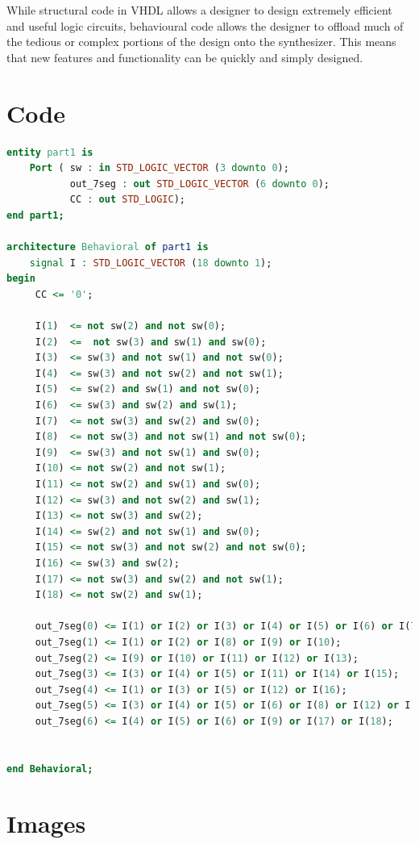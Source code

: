 \documentclass{article}
\begin{document}
While structural code in VHDL allows a designer to design extremely efficient and useful
logic circuits, behavioural code allows the designer to offload much of the tedious or complex
portions of the design onto the synthesizer.
This means that new features and functionality can be quickly and simply designed.

\newpage


\appendix

\section{Code}

\begin{lstlisting}[language=VHDL]
entity part1 is
    Port ( sw : in STD_LOGIC_VECTOR (3 downto 0);
           out_7seg : out STD_LOGIC_VECTOR (6 downto 0);
           CC : out STD_LOGIC);
end part1;

architecture Behavioral of part1 is
    signal I : STD_LOGIC_VECTOR (18 downto 1);
begin
     CC <= '0';

     I(1)  <= not sw(2) and not sw(0);
     I(2)  <=  not sw(3) and sw(1) and sw(0);
     I(3)  <= sw(3) and not sw(1) and not sw(0);
     I(4)  <= sw(3) and not sw(2) and not sw(1);
     I(5)  <= sw(2) and sw(1) and not sw(0);
     I(6)  <= sw(3) and sw(2) and sw(1);
     I(7)  <= not sw(3) and sw(2) and sw(0);
     I(8)  <= not sw(3) and not sw(1) and not sw(0);
     I(9)  <= sw(3) and not sw(1) and sw(0);
     I(10) <= not sw(2) and not sw(1);
     I(11) <= not sw(2) and sw(1) and sw(0);
     I(12) <= sw(3) and not sw(2) and sw(1);
     I(13) <= not sw(3) and sw(2);
     I(14) <= sw(2) and not sw(1) and sw(0);
     I(15) <= not sw(3) and not sw(2) and not sw(0);
     I(16) <= sw(3) and sw(2);
     I(17) <= not sw(3) and sw(2) and not sw(1);
     I(18) <= not sw(2) and sw(1);
     
     out_7seg(0) <= I(1) or I(2) or I(3) or I(4) or I(5) or I(6) or I(7);
     out_7seg(1) <= I(1) or I(2) or I(8) or I(9) or I(10);
     out_7seg(2) <= I(9) or I(10) or I(11) or I(12) or I(13);
     out_7seg(3) <= I(3) or I(4) or I(5) or I(11) or I(14) or I(15);
     out_7seg(4) <= I(1) or I(3) or I(5) or I(12) or I(16);
     out_7seg(5) <= I(3) or I(4) or I(5) or I(6) or I(8) or I(12) or I(17);
     out_7seg(6) <= I(4) or I(5) or I(6) or I(9) or I(17) or I(18);


end Behavioral;
\end{lstlisting}

\section{Images}
\end{document}
